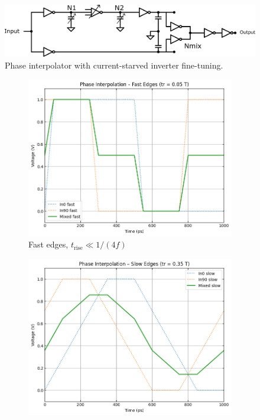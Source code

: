 \begin{figure}[htbp]
  \centering
  \includegraphics[width=0.8\linewidth]{figures/Schematics/clock_generation_half_CSI.png}
  \caption{Phase interpolator with current-starved inverter fine-tuning.}
  \label{fig:PI_csi_schematic}
\end{figure}

\begin{figure}[htbp]
  \centering
  \begin{subfigure}[b]{0.40\linewidth}
    \centering
    \includegraphics[width=\linewidth]{figures/Python/pi_fast_edges.png}
    \caption{Fast edges, $t_{\text{rise}}\!\ll\!1/(4f)$}
    \label{fig:fast}
  \end{subfigure}
  \hfill
  \begin{subfigure}[b]{0.40\linewidth}
    \centering
    \includegraphics[width=\linewidth]{figures/Python/pi_slow_edges.png}

\end{subfigure}
\end{figure}
